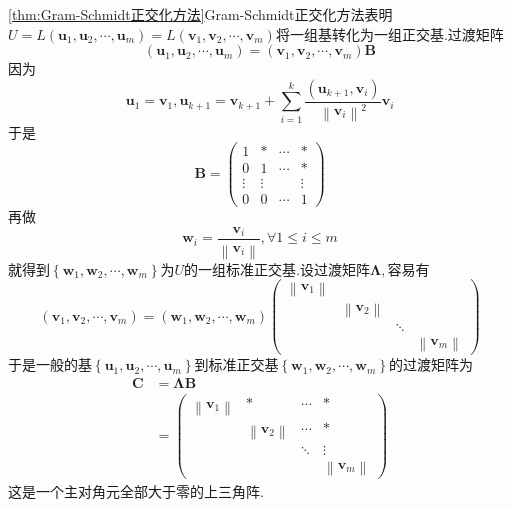 \begin{red}
    \begin{remark}
        \cref{thm:Gram-Schmidt正交化方法}\textup{Gram-Schmidt}正交化方法表明$U=L\left(
            \bm{u}_1,\bm{u}_2,\cdots,\bm{u}_m
        \right)=L\left(
            \bm{v}_1,\bm{v}_2,\cdots,\bm{v}_m
        \right)$将一组基转化为一组正交基.过渡矩阵\[
        \left(
            \bm{u}_1,\bm{u}_2,\cdots,\bm{u}_m
        \right)=\left(
            \bm{v}_1,\bm{v}_2,\cdots,\bm{v}_m
            \right)\bm{B}
        \]因为\[\bm{u}_1=\bm{v}_1,
        \bm{u}_{k+1}=\bm{v}_{k+1}+\sum_{i=1}^{k}\frac{\left(
            \bm{u}_{k+1},\bm{v}_i
        \right)}{\left\lVert \bm{v}_i\right\rVert ^2}\bm{v}_i
        \]于是\newpage\[
        \bm{B}=\begin{pmatrix}
            1&*&\cdots&*\\
            0&1&\cdots&*\\
            \vdots&\vdots&&\vdots\\
            0&0&\cdots&1
        \end{pmatrix}
        \]再做\[
        \bm{w}_i=\frac{\bm{v}_i}{\left\lVert \bm{v}_i\right\rVert },\forall 1\leqslant i\leqslant m
        \]就得到$\left\{
            \bm{w}_1,\bm{w}_2,\cdots,\bm{w}_m
        \right\}$为$U$的一组标准正交基.设过渡矩阵$\bm{\Lambda},$容易有\[
        \left(
            \bm{v}_1,\bm{v}_2,\cdots,\bm{v}_m
        \right)=\left(
            \bm{w}_1,\bm{w}_2,\cdots,\bm{w}_m
        \right)\begin{pmatrix}
            \left\lVert \bm{v}_1\right\rVert &&&\\
            &\left\lVert \bm{v}_2\right\rVert&&\\
            &&\ddots&\\
            &&&\left\lVert \bm{v}_m\right\rVert
        \end{pmatrix}
        \]于是一般的基$\left\{
            \bm{u}_1,\bm{u}_2,\cdots,\bm{u}_m
            \right\}$到标准正交基$\left\{
                \bm{w}_1,\bm{w}_2,\cdots,\bm{w}_m
            \right\}$的过渡矩阵为\begin{align*}
                \bm{C}&=\bm{\Lambda}\bm{B}\\
                &=\begin{pmatrix}
                    \left\lVert \bm{v}_1\right\rVert &*&\cdots&*\\
                    &\left\lVert \bm{v}_2\right\rVert&\cdots&*\\
                    &&\ddots&\vdots\\
                    &&&\left\lVert \bm{v}_m\right\rVert
                \end{pmatrix}
            \end{align*}这是一个主对角元全部大于零的上三角阵.
    \end{remark}
\end{red}
